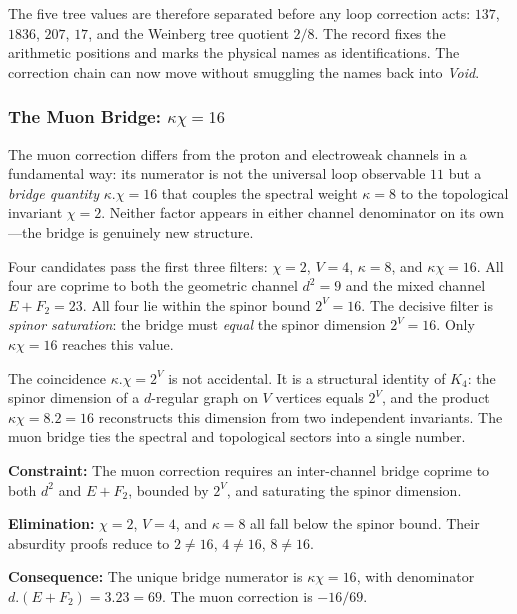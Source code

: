 \documentclass[11pt,a4paper]{book}
\def\cdot{.}%
\begin{document}
The five tree values are therefore separated before any loop correction
acts: $137$, $1836$, $207$, $17$, and the Weinberg tree quotient $2/8$.
The record fixes the arithmetic positions and marks the physical names as
identifications.  The correction chain can now move without smuggling the
names back into \textit{Void}.

\subsubsection*{The Muon Bridge: $\kappa \chi = 16$}

The muon correction differs from the proton and electroweak channels in
a fundamental way: its numerator is not the universal loop observable $11$
but a \emph{bridge quantity} $\kappa \cdot \chi = 16$ that couples the
spectral weight $\kappa = 8$ to the topological invariant $\chi = 2$.
Neither factor appears in either channel denominator on its own---the
bridge is genuinely new structure.

Four candidates pass the first three filters:
$\chi = 2$, $V = 4$, $\kappa = 8$, and $\kappa \chi = 16$.
All four are coprime to both the geometric channel $d^2 = 9$
and the mixed channel $E + F_2 = 23$.  All four lie within the
spinor bound $2^V = 16$.  The decisive filter is \emph{spinor
saturation}: the bridge must \emph{equal} the spinor dimension
$2^V = 16$.  Only $\kappa \chi = 16$ reaches this value.

The coincidence $\kappa \cdot \chi = 2^V$ is not accidental.
It is a structural identity of $K_4$: the spinor dimension of a
$d$-regular graph on $V$ vertices equals $2^V$, and the product
$\kappa \chi = 8 \cdot 2 = 16$ reconstructs this dimension from
two independent invariants.  The muon bridge ties the spectral and
topological sectors into a single number.

\textbf{Constraint:}
The muon correction requires an inter-channel bridge coprime to
both $d^2$ and $E + F_2$, bounded by $2^V$, and saturating the
spinor dimension.

\textbf{Elimination:}
$\chi = 2$, $V = 4$, and $\kappa = 8$ all fall below the spinor
bound.  Their absurdity proofs reduce to $2 \neq 16$, $4 \neq 16$,
$8 \neq 16$.

\textbf{Consequence:}
The unique bridge numerator is $\kappa \chi = 16$, with denominator
$d \cdot (E + F_2) = 3 \cdot 23 = 69$.  The muon correction is
$-16/69$.
\end{document}
